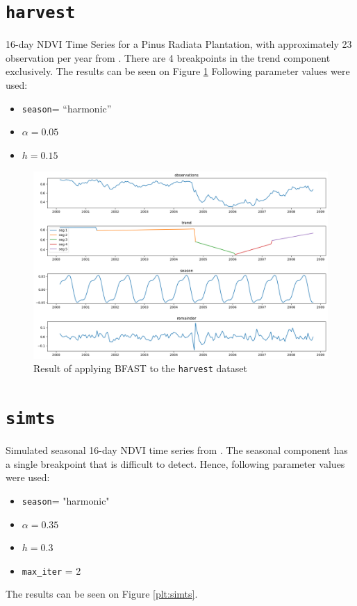 \documentclass[main.tex]{subfiles}
\begin{document}
\section{\texttt{harvest}}
\label{sec:val_harvest}
16-day NDVI Time Series for a Pinus Radiata Plantation, with approximately 23
observation per year from \cite{bfast}. There are 4 breakpoints in the trend
component exclusively. The results can be seen on Figure \ref{plt:harvest}
Following parameter values were used:
\begin{itemize}
\item \texttt{season}= ``harmonic''
\item $\alpha = 0.05$
\item $h = 0.15$
\end{itemize}

\begin{figure}
  \centering
  \includegraphics[width=\textwidth]{imgs/harvest.png}
  \caption{Result of applying BFAST to the \texttt{harvest} dataset}
  \label{plt:harvest}
\end{figure}

\section{\texttt{simts}}
\label{sec:val_simts}
Simulated seasonal 16-day NDVI time series from \cite{bfast}. The seasonal
component has a single breakpoint that is difficult to detect. Hence, following
parameter values were used:
\begin{itemize}
\item \texttt{season}= "harmonic"
\item $\alpha = 0.35$
\item $h = 0.3$
\item \texttt{max\_iter} = 2
\end{itemize}
The results can be seen on Figure \ref{plt:simts}.
\end{document}
